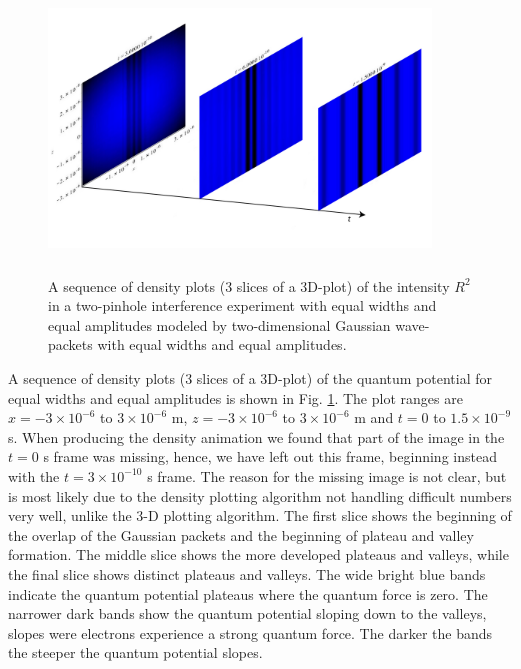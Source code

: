 \documentclass[12pt]{article}       %
\begin{document}
\begin{figure}[h]
\unitlength=1in 
\hspace*{1.0in}\includegraphics[width=4in,height=3in]  {figure9.jpg} 
\caption{A sequence of density plots (3 slices of a 3D-plot) of the intensity $R^2$ in a two-pinhole interference experiment with  equal widths and equal amplitudes modeled by two-dimensional Gaussian wave-packets with equal widths and equal amplitudes.\label{T2DGQPDP}}
\end{figure}
A sequence of density plots (3 slices of a 3D-plot) of the quantum potential  for equal widths and equal amplitudes is shown in Fig. \ref{T2DGQPDP}. The plot  ranges are $x=-3\times 10^{-6}$ to $3\times 10^{-6}$ m, $z=-3\times 10^{-6}$ to $3\times 10^{-6}$ m  and $t=0$ to $1.5\times 10^{-9}$ s. When producing the density animation we found that part of the image in the $t=0$ s frame was missing, hence, we have left out this frame, beginning instead with the $t=3\times 10^{-10}$ s frame. The reason for the missing image  is not clear, but is most likely due to the density plotting algorithm not handling difficult numbers very well, unlike the 3-D plotting algorithm.  The first slice shows the beginning of the overlap of the Gaussian packets and the beginning of plateau and valley formation. The middle slice shows the more developed plateaus and valleys, while the final slice shows distinct plateaus and valleys. The wide bright blue bands indicate the quantum potential plateaus where the quantum force is zero. The narrower dark bands show the quantum potential sloping down to the valleys, slopes were electrons experience a strong quantum force. The darker the bands the steeper the quantum potential slopes.
\end{document}
